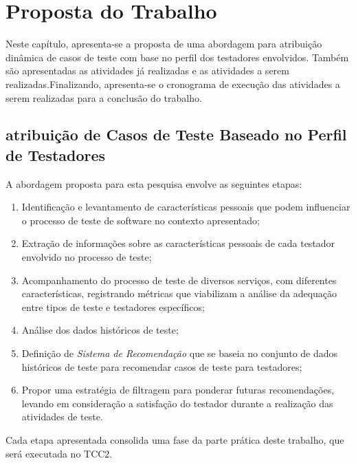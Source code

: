 \chapter{Proposta do Trabalho}
\label{ch:proposta}

Neste capítulo, apresenta-se a proposta de uma abordagem para atribuição dinâmica de casos de teste com base no perfil dos testadores envolvidos. Também são apresentadas as atividades já realizadas e as atividades a serem realizadas.Finalizando, apresenta-se o cronograma de execução das atividades a serem realizadas para a conclusão do trabalho.

\section{atribuição de Casos de Teste Baseado no Perfil de Testadores}

A abordagem proposta para esta pesquisa envolve as seguintes etapas:

\begin{enumerate}
    \item Identificação e levantamento de características pessoais que podem influenciar o processo de teste de software no contexto apresentado;

    \item Extração de informações sobre as características pessoais de cada testador envolvido no processo de teste;

    \item Acompanhamento do processo de teste de diversos serviços, com diferentes características, registrando métricas que viabilizam a análise da adequação entre tipos de teste e testadores específicos;

    \item Análise dos dados históricos de teste;

    \item Definição de \textit{Sistema de Recomendação} que se baseia no conjunto de dados históricos de teste para recomendar casos de teste para testadores;

    \item Propor uma estratégia de filtragem para ponderar futuras recomendações, levando em consideração a satisfação do testador durante a realização das atividades de teste.
\end{enumerate}

Cada etapa apresentada consolida uma fase da parte prática deste trabalho, que será executada no TCC2.

